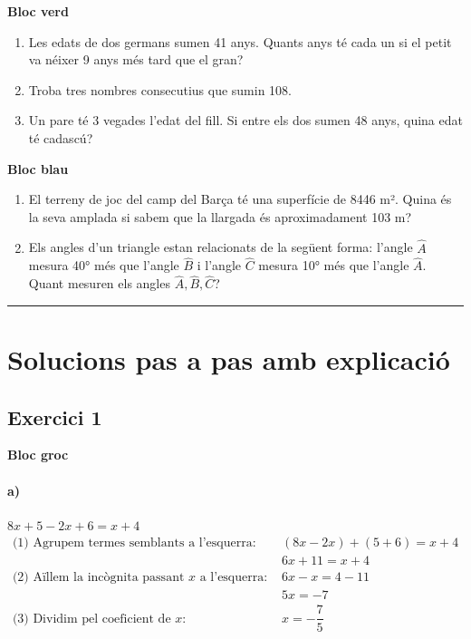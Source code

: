 \documentclass[11pt,a4paper]{article}
\begin{document}
\begin{blocverd}
\textbf{Bloc verd}
\begin{enumerate}[label=\alph*), start=3]
\item Les edats de dos germans sumen 41 anys. Quants anys té cada un si el petit va néixer 9 anys més tard que el gran?
\item Troba tres nombres consecutius que sumin 108.
\item Un pare té 3 vegades l’edat del fill. Si entre els dos sumen 48 anys, quina edat té cadascú?
\end{enumerate}
\end{blocverd}

\begin{blocblau}
\textbf{Bloc blau}
\begin{enumerate}[label=\alph*), start=6]
\item El terreny de joc del camp del Barça té una superfície de 8446 m². Quina és la seva amplada si sabem que la llargada és aproximadament 103 m?
\item Els angles d’un triangle estan relacionats de la següent forma: l’angle $\hat{A}$ mesura 40° més que l’angle $\hat{B}$ i l’angle $\hat{C}$ mesura 10° més que l’angle $\hat{A}$. Quant mesuren els angles $\hat{A}, \hat{B}, \hat{C}$?
\end{enumerate}
\end{blocblau}

\bigskip\hrule\bigskip
\section*{Solucions pas a pas amb explicació}

\subsection*{Exercici 1}

\textbf{Bloc groc}

\paragraph{a)} $8x + 5 - 2x + 6 = x + 4$
\[
\begin{aligned}
\text{(1) Agrupem termes semblants a l'esquerra: } & (8x - 2x) + (5+6) = x + 4 \\
& 6x + 11 = x + 4 \\
\text{(2) Aïllem la incògnita passant $x$ a l'esquerra: } & 6x - x = 4 - 11 \\
& 5x = -7 \\
\text{(3) Dividim pel coeficient de $x$: } & \boxed{x = -\dfrac{7}{5}}
\end{aligned}
\]
\end{document}
